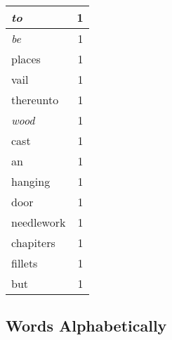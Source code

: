 \begin{center}
\begin{longtable}{l|r}
\emph{to} & 1 \\ \hline
\emph{be} & 1 \\ \hline
places & 1 \\ \hline
vail & 1 \\ \hline
thereunto & 1 \\ \hline
\emph{wood} & 1 \\ \hline
cast & 1 \\ \hline
an & 1 \\ \hline
hanging & 1 \\ \hline
door & 1 \\ \hline
needlework & 1 \\ \hline
chapiters & 1 \\ \hline
fillets & 1 \\ \hline
but & 1 \\ \hline
\end{longtable}
\end{center}



\normalsize



\subsection{Words Alphabetically}

